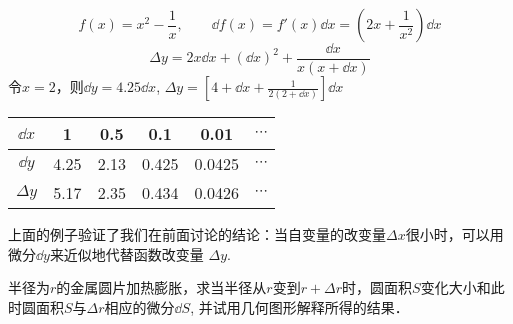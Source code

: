 \begin{example}
\[f(x)=x^2-\frac{1}{x},\qquad \dd f(x)=f'(x)\dd x=\left(2x+\frac{1}{x^2}\right)\dd x\]
\[\Delta y=2x\dd x+(\dd x)^2+\frac{\dd x}{x(x+\dd x)}\]
令$x=2$，则$\dd y=4.25\dd x$, $\Delta y=\left[4+\dd x+\frac{1}{2(2+\dd x)}\right]\dd x$
\begin{center}
    \begin{tabular}{cccccc}
        \hline
    $\dd x$ & 1& 0.5& 0.1 & 0.01& $\cdots$\\
        \hline
    $\dd y$& 4.25&2.13&0.425& 0.0425&$\cdots$\\
    \hline
    $\Delta y$& 5.17& 2.35&0.434&0.0426&$\cdots$\\
        \hline
    \end{tabular}
    \end{center}
上面的例子验证了我们在前面讨论的结论：当自变量的改变量$\Delta x$很小时，可以用微分$\dd y$来近似地代替函数改变量
$\Delta y$.
\end{example}

\begin{example}
    半径为$r$的金属圆片加热膨胀，求当半径从$r$变到$r+\Delta r$时，圆面积$S$变化大小和此时圆面积$S$与$\Delta r$相应的微分$\dd S$, 并试用几何图形解释所得的结果．
\end{example}

